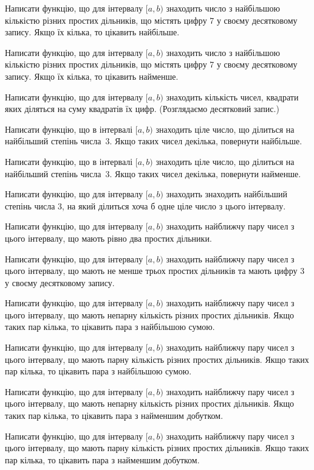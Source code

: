 \documentclass[12pt, ukrainian]{article}
\begin{document}
Написати функцію, що для інтервалу $[a, b)$ знаходить число з найбільшою кількістю різних простих дільників, що містять цифру 7 у своєму десятковому запису. Якщо їх кілька, то цікавить найбільше.

Написати функцію, що для інтервалу $[a, b)$ знаходить число з найбільшою кількістю різних простих дільників, що містять цифру 7 у своєму десятковому запису. Якщо їх кілька, то цікавить найменше.







Написати функцію, що для інтервалу $[a, b)$ знаходить кількість чисел, квадрати яких діляться на суму квадратів їх цифр. (Розглядаємо десятковий запис.)

Написати функцію, що в інтервалі $[a, b)$ знаходить ціле число, що ділиться на найбільший степінь числа 3. Якщо таких чисел декілька, повернути найбільше. 

Написати функцію, що в інтервалі $[a, b)$ знаходить ціле число, що ділиться на найбільший степінь числа 3. Якщо таких чисел декілька, повернути найменше. 

Написати функцію, що для інтервалу $[a, b)$ знаходить знаходить найбільший степінь числа 3, на який ділиться хоча б одне ціле число з цього інтервалу.

Написати функцію, що для інтервалу $[a, b)$ знаходить найближчу пару чисел з цього інтервалу, що мають рівно два простих дільники.

Написати функцію, що для інтервалу $[a, b)$ знаходить найближчу пару чисел з цього інтервалу, що мають не менше трьох простих дільників та мають цифру 3 у своєму десятковому запису.

Написати функцію, що для інтервалу $[a, b)$ знаходить найближчу пару чисел з цього інтервалу, що мають непарну кількість різних простих дільників.
Якщо таких пар кілька, то цікавить пара з найбільшою сумою.

Написати функцію, що для інтервалу $[a, b)$ знаходить найближчу пару чисел з цього інтервалу, що мають парну кількість різних простих дільників.
Якщо таких пар кілька, то цікавить пара з найбільшою сумою.

Написати функцію, що для інтервалу $[a, b)$ знаходить найближчу пару чисел з цього інтервалу, що мають непарну кількість різних простих дільників.
Якщо таких пар кілька, то цікавить пара з найменшим добутком.

Написати функцію, що для інтервалу $[a, b)$ знаходить найближчу пару чисел з цього інтервалу, що мають парну кількість різних простих дільників.
Якщо таких пар кілька, то цікавить пара з найменшим добутком.
\end{document}
